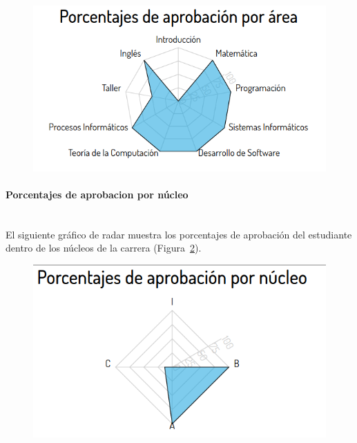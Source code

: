 \begin{figure}[H]
  \centering
    \includegraphics[scale=0.4]{images/seguimiento-academico/sa-porcentajesarea.png}
  \label{fig:sa-porcentaje-area}
\end{figure}

\paragraph{Porcentajes de aprobacion por núcleo} \mbox{}\\
El siguiente gráfico de radar muestra los porcentajes de aprobación del estudiante dentro de los núcleos de la carrera (Figura~\ref{fig:sa-porcentaje-nucleo}).

\begin{figure}[H]
  \centering
    \includegraphics[scale=0.4]{images/seguimiento-academico/sa-porcentajesnucleo.png}
  \label{fig:sa-porcentaje-nucleo}
\end{figure}

